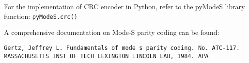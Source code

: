 For the implementation of CRC encoder in Python, refer to the pyModeS
library function: \texttt{pyModeS.crc()}

A comprehensive documentation on Mode-S parity coding can be found:

\begin{verbatim}
Gertz, Jeffrey L. Fundamentals of mode s parity coding. No. ATC-117.
MASSACHUSETTS INST OF TECH LEXINGTON LINCOLN LAB, 1984. APA
\end{verbatim}
